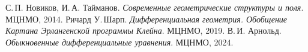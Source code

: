 \begin{thebibliography}{9}
	 С.\,П. Новиков, И.\,А. Тайманов. \textit{Современные геометрические структуры и поля}. МЦНМО, 2014.
	 Ричард У.\,Шарп. \textit{Дифференциальная геометрия. Обобщение Картана Эрлангенской программы Клейна}. МЦНМО, 2019.
	 В.\,И. Арнольд. \textit{Обыкновенные дифференциальные уравнения}. МЦНМО, 2024.
\end{thebibliography}

